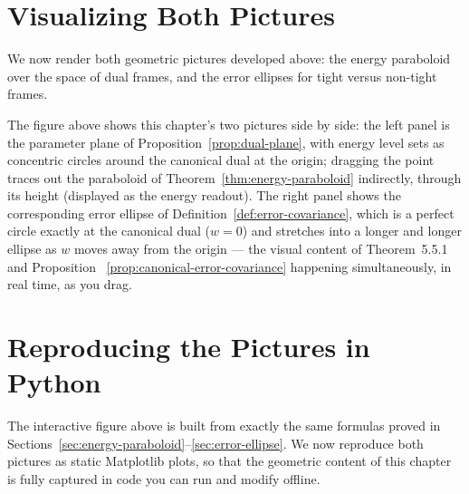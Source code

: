 \section{Visualizing Both Pictures}
\label{sec:visualizing}

We now render both geometric pictures developed above: the energy
paraboloid over the space of dual frames, and the error ellipses for
tight versus non-tight frames.

The figure above shows this chapter's two pictures side by side: the
left panel is the parameter plane of Proposition~\ref{prop:dual-plane},
with energy level sets as concentric circles around the canonical dual
at the origin; dragging the point traces out the paraboloid of
Theorem~\ref{thm:energy-paraboloid} indirectly, through its height
(displayed as the energy readout). The right panel shows the
corresponding error ellipse of Definition~\ref{def:error-covariance}, which
is a perfect circle exactly at the canonical dual ($w=0$) and stretches
into a longer and longer ellipse as $w$ moves away from the origin ---
the visual content of Theorem~5.5.1 and Proposition~
\ref{prop:canonical-error-covariance} happening simultaneously, in real
time, as you drag.

\section{Reproducing the Pictures in Python}
\label{sec:numpy-geometry}

The interactive figure above is built from exactly the same formulas
proved in Sections~\ref{sec:energy-paraboloid}--\ref{sec:error-ellipse}.
We now reproduce both pictures as static Matplotlib plots, so that the
geometric content of this chapter is fully captured in code you can run
and modify offline.

